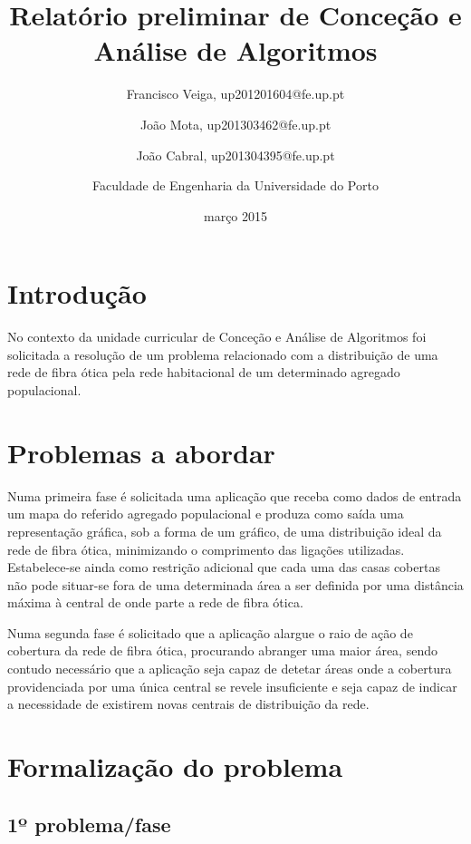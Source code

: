\documentclass[a4paper,12pt,titlepage]{article}
\begin{document}
\title{Relatório preliminar de Conceção e Análise de Algoritmos}
\date{março 2015}
\author{Francisco Veiga, up201201604@fe.up.pt
 \and João Mota, up201303462@fe.up.pt
 \and João Cabral, up201304395@fe.up.pt \linebreak
 \and Faculdade de Engenharia da Universidade do Porto}
%
\maketitle
\tableofcontents
\newpage
\section{Introdução}

No contexto da unidade curricular de Conceção e Análise de Algoritmos foi solicitada a resolução de um problema relacionado com a distribuição de uma rede de fibra ótica pela rede habitacional de um determinado agregado populacional.

\section{Problemas a abordar} 
Numa primeira fase é solicitada uma aplicação que receba como dados de entrada um mapa do referido agregado populacional e produza como saída uma representação gráfica, sob a forma de um gráfico, de uma distribuição ideal da rede de fibra ótica, minimizando o comprimento das ligações utilizadas. Estabelece-se ainda como restrição adicional que cada uma das casas cobertas não pode situar-se fora de uma determinada área a ser definida por uma distância máxima à central de onde parte a rede de fibra ótica.
 
Numa segunda fase é solicitado que a aplicação alargue o raio de ação de cobertura da rede de fibra ótica, procurando abranger uma maior área, sendo contudo necessário que a aplicação seja capaz de detetar áreas onde a cobertura providenciada por uma única central se revele insuficiente e seja capaz de indicar a necessidade de existirem novas centrais de distribuição da rede.

\newpage
\section{Formalização do problema}

\subsection{1º problema/fase}
\end{document}
